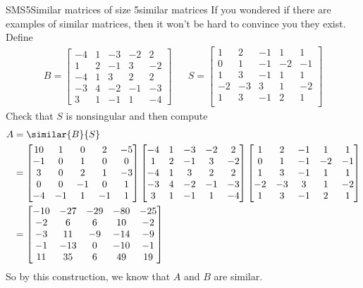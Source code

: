\begin{example}{SMS5}{Similar matrices of size 5}{similar matrices}
If you wondered if there are examples of similar matrices, then it won't be hard to convince you they exist.  Define
%
\begin{align*}
B=\begin{bmatrix}
-4 & 1 & -3 & -2 & 2 \\
1 & 2 & -1 & 3 & -2 \\
-4 & 1 & 3 & 2 & 2 \\
-3 & 4 & -2 & -1 & -3 \\
3 & 1 & -1 & 1 & -4
\end{bmatrix}
&&
S=\begin{bmatrix}
1 & 2 & -1 & 1 & 1 \\
0 & 1 & -1 & -2 & -1 \\
1 & 3 & -1 & 1 & 1 \\
-2 & -3 & 3 & 1 & -2 \\
1 & 3 & -1 & 2 & 1\\
\end{bmatrix}
\end{align*}
%
Check that $S$ is nonsingular and then compute
%
\begin{align*}
A&=\similar{B}{S}\\
&=
\begin{bmatrix}
10 & 1 & 0 & 2 & -5 \\
-1 & 0 & 1 & 0 & 0 \\
3 & 0 & 2 & 1 & -3 \\
0 & 0 & -1 & 0 & 1 \\
-4 & -1 & 1 & -1 & 1
\end{bmatrix}
\begin{bmatrix}
-4 & 1 & -3 & -2 & 2 \\
1 & 2 & -1 & 3 & -2 \\
-4 & 1 & 3 & 2 & 2 \\
-3 & 4 & -2 & -1 & -3 \\
3 & 1 & -1 & 1 & -4
\end{bmatrix}
\begin{bmatrix}
1 & 2 & -1 & 1 & 1 \\
0 & 1 & -1 & -2 & -1 \\
1 & 3 & -1 & 1 & 1 \\
-2 & -3 & 3 & 1 & -2 \\
1 & 3 & -1 & 2 & 1
\end{bmatrix}\\
&=
\begin{bmatrix}
-10 & -27 & -29 & -80 & -25 \\
-2 & 6 & 6 & 10 & -2 \\
-3 & 11 & -9 & -14 & -9 \\
-1 & -13 & 0 & -10 & -1 \\
11 & 35 & 6 & 49 & 19
\end{bmatrix}
%
\end{align*}
%
So by this construction, we know that $A$ and $B$ are similar.
%
\end{example}
